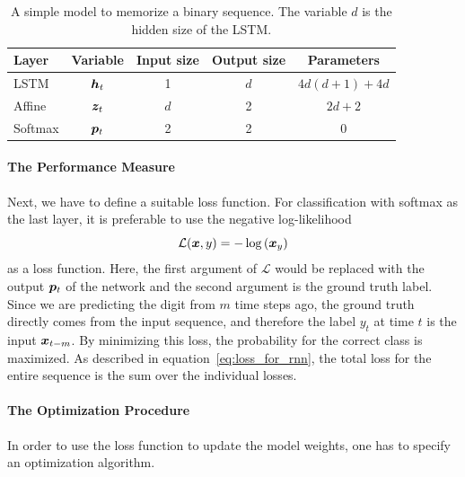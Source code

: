 		\begin{table}[tb]
			\small
			\begin{center}
				\begin{tabular}{|l|c|c|c|c|}
					\hline
					Layer 	& Variable 			& Input size 	& Output size 	& Parameters 			\\ \hline
					LSTM 	& $\bm{h}_t$		& 1 			& $d$ 			& $4d(d + 1) + 4d$ 		\\ \hline
					Affine 	& $\bm{z}_t$		& $d$ 			& 2 			& $2d + 2$ 				\\ \hline
					Softmax & $\bm{p}_t$		& 2 			& 2 			& 0						\\ \hline
				\end{tabular}
			\end{center}
			\caption[A simple model to memorize a binary sequence]
					{A simple model to memorize a binary sequence. 
					 The variable $d$ is the hidden size of the LSTM.}
			\label{tbl:model_classification_binary_digits}
		\end{table}
		
		\paragraph{The Performance Measure}
		Next, we have to define a suitable loss function. 
		For classification with softmax as the last layer, it is preferable to use the negative log-likelihood
		\begin{equation}
			\mathcal{L}(\bm{x}, y) = -\log\left(\bm{x}_y\right)
		\end{equation}
		as a loss function. 
		Here, the first argument of $\mathcal{L}$ would be replaced with the output $\bm{p}_t$ of the network and the second argument is the ground truth label. 
		Since we are predicting the digit from $m$ time steps ago, the ground truth directly comes from the input sequence, and therefore the label $y_t$ at time $t$ is the input $\bm{x}_{t - m}$.
		By minimizing this loss, the probability for the correct class is maximized.
		As described in equation~\ref{eq:loss_for_rnn}, the total loss for the entire sequence is the sum over the individual losses.
		
		\paragraph{The Optimization Procedure}
		In order to use the loss function to update the model weights, one has to specify an optimization algorithm.

